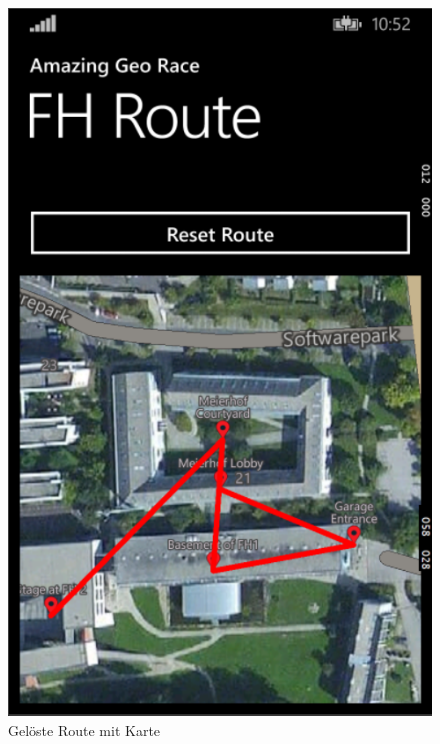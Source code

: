 \documentclass[a4paper,ngerman]{scrartcl}
\begin{document}
\begin{figure}[h]
\centering
\includegraphics[width=.95\textwidth]{images/routeDetailsPage_Final}
\caption{Gelöste Route mit Karte}
\end{figure}
\end{document}
